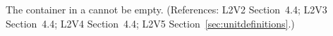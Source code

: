 The  container in a \UnitDefinition cannot be
empty.  (References: L2V2 Section~4.4; L2V3 Section~4.4; L2V4 Section~4.4; L2V5 Section~\ref{sec:unitdefinitions}.)
